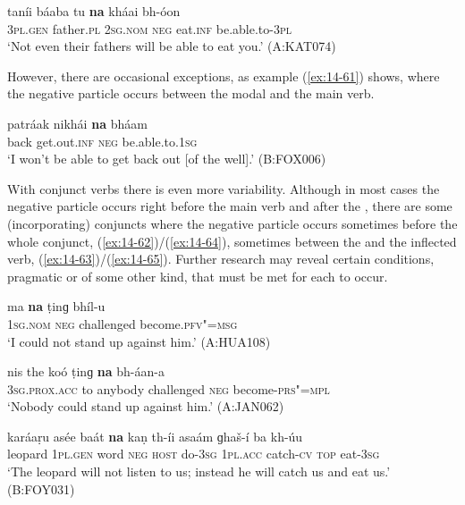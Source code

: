 \ex
\label{ex:14-60}
\gll taníi báaba tu \textbf{na} kháai bh-óon \\
\textsc{3pl.gen} father.\textsc{pl} \textsc{2sg.nom} \textsc{neg} eat.\textsc{inf} be.able.to-\textsc{3pl} \\
\glt `Not even their fathers will be able to eat you.' (A:KAT074)
\z

However, there are occasional exceptions, as example (\ref{ex:14-61}) shows, where the negative particle occurs between the modal and the main verb.

\begin{exe}
\ex
\label{ex:14-61}
\gll patráak nikhái \textbf{na} bháam \\
back get.out.\textsc{inf} \textsc{neg} be.able.to.\textsc{1sg} \\
\glt `I won't be able to get back out [of the well].' (B:FOX006)
\end{exe}

With conjunct verbs there is even more variability. Although in most cases the negative particle occurs right before the main verb and after the , there are some (incorporating) conjuncts where the negative particle occurs sometimes before the whole conjunct, (\ref{ex:14-62})/(\ref{ex:14-64}), sometimes between the  and the inflected verb, (\ref{ex:14-63})/(\ref{ex:14-65}). Further research may reveal certain conditions, pragmatic or of some other kind, that must be met for each to occur. 

\ea
\label{ex:14-62}
\gll ma \textbf{na} ṭinɡ bhíl-u \\
\textsc{1sg.nom} \textsc{neg} challenged become.\textsc{pfv"=msg } \\
\glt `I could not stand up against him.' (A:HUA108)

\ex
\label{ex:14-63}
\gll nis the koó ṭinɡ \textbf{na} bh-áan-a \\
\textsc{3sg.prox.acc} to anybody challenged \textsc{neg} become-\textsc{prs"=mpl } \\
\glt `Nobody could stand up against him.' (A:JAN062)

\ex
\label{ex:14-64}
\gll karáaṛu asée baát \textbf{na} kaṇ th-íi asaám ɡhaš-í ba kh-úu \\
leopard \textsc{1pl.gen} word \textsc{neg} \textsc{host} do-\textsc{3sg} \textsc{1pl.acc} catch-\textsc{cv}  \textsc{top} eat-\textsc{3sg} \\
\glt `The leopard will not listen to us; instead he will catch us and eat us.' (B:FOY031)

